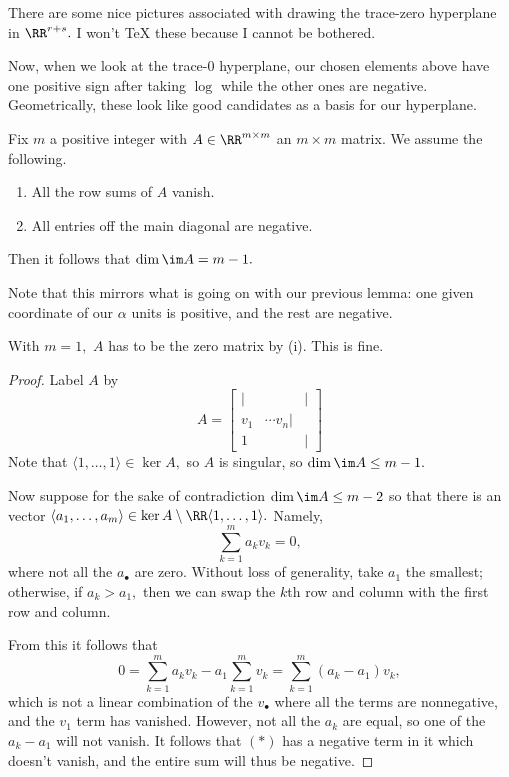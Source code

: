 \begin{remark}
    There are some nice pictures associated with drawing the trace-zero hyperplane in $\RR^{r+s}.$ I won't TeX these because I cannot be bothered.
\end{remark}
Now, when we look at the trace-$0$ hyperplane, our chosen elements above have one positive sign after taking $\log$ while the other ones are negative. Geometrically, these look like good candidates as a basis for our hyperplane.
\begin{lemma} \label{lem:matrixrank}
    Fix $m$ a positive integer with $A\in\RR^{m\times m}$ an $m\times m$ matrix. We assume the following.
    \begin{enumerate}[label=(\roman*)]
        \item All the row sums of $A$ vanish.
        \item All entries off the main diagonal are negative.
    \end{enumerate}
    Then it follows that $\dim\im A=m-1.$
\end{lemma}
Note that this mirrors what is going on with our previous lemma: one given coordinate of our $\alpha$ units is positive, and the rest are negative.
\begin{example}
    With $m=1,$ $A$ has to be the zero matrix by (i). This is fine.
\end{example}
\begin{proof}
    Label $A$ by
    \[A=\begin{bmatrix}
        | & & | \\
        v_1 & \cdots v_n | \\
        1 & & |
    \end{bmatrix}\]
    Note that $\langle1,\ldots,1\rangle\in\ker A,$ so $A$ is singular, so $\dim\im A\le m-1.$

    Now suppose for the sake of contradiction $\dim\im A\le m-2$ so that there is an vector $\langle a_1,\ldots,a_m\rangle\in\ker A\setminus\RR\langle1,\ldots,1\rangle.$ Namely,
    \[\sum_{k=1}^ma_kv_k=0,\]
    where not all the $a_\bullet$ are zero. Without loss of generality, take $a_1$ the smallest; otherwise, if $a_k>a_1,$ then we can swap the $k$th row and column with the first row and column.

    From this it follows that
    \[0=\sum_{k=1}^ma_kv_k-a_1\sum_{k=1}^mv_k=\sum_{k=1}^m(a_k-a_1)v_k,\tag{$*$}\]
    which is not a linear combination of the $v_\bullet$ where all the terms are nonnegative, and the $v_1$ term has vanished. However, not all the $a_k$ are equal, so one of the $a_k-a_1$ will not vanish. It follows that $(*)$ has a negative term in it which doesn't vanish, and the entire sum will thus be negative.
\end{proof}
